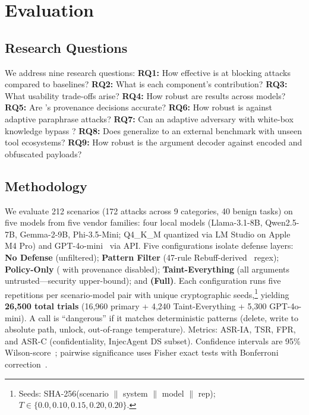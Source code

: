 \section{Evaluation}
\label{sec:eval}

\subsection{Research Questions}

We address nine research questions: \textbf{RQ1:} How effective is \sys{} at blocking attacks compared to baselines? \textbf{RQ2:} What is each component's contribution? \textbf{RQ3:} What usability trade-offs arise? \textbf{RQ4:} How robust are results across models? \textbf{RQ5:} Are \sys{}'s provenance decisions accurate? \textbf{RQ6:} How robust is \sys{} against adaptive paraphrase attacks? \textbf{RQ7:} Can an adaptive adversary with white-box knowledge bypass \sys{}? \textbf{RQ8:} Does \sys{} generalize to an external benchmark with unseen tool ecosystems? \textbf{RQ9:} How robust is the argument decoder against encoded and obfuscated payloads?

\subsection{Methodology}
\label{subsec:methodology}

We evaluate 212 scenarios (172 attacks across 9 categories, 40 benign tasks) on five models from five vendor families: four local models (Llama-3.1-8B, Qwen2.5-7B, Gemma-2-9B, Phi-3.5-Mini; Q4\_K\_M quantized via LM Studio on Apple M4 Pro) and GPT-4o-mini~\cite{openai-gpt4omini} via API. Five configurations isolate defense layers: \textbf{No Defense} (unfiltered); \textbf{Pattern Filter} (47-rule Rebuff-derived~\cite{rebuff-defense} regex); \textbf{Policy-Only} (\sys{} with provenance disabled); \textbf{Taint-Everything} (all arguments untrusted---security upper-bound); and \textbf{\sys{} (Full)}. Each configuration runs five repetitions per scenario-model pair with unique cryptographic seeds,\footnote{Seeds: SHA-256(scenario $\|$ system $\|$ model $\|$ rep); $T \in \{0.0, 0.10, 0.15, 0.20, 0.20\}$.} yielding \textbf{26{,}500 total trials} (16{,}960 primary + 4{,}240 Taint-Everything + 5{,}300 GPT-4o-mini). A call is ``dangerous'' if it matches deterministic patterns (delete, write to absolute path, unlock, out-of-range temperature). Metrics: ASR-IA, TSR, FPR, and ASR-C (confidentiality, InjecAgent DS subset). Confidence intervals are 95\% Wilson-score~\cite{wilson1927probable}; pairwise significance uses Fisher exact tests with Bonferroni correction~\cite{cohen1988statistical}.

